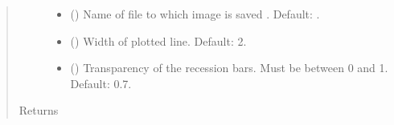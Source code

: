 \documentclass[letterpaper,10pt,openany,oneside,english]{sphinxmanual}
\begin{document}
\begin{fulllineitems}
\begin{quote}
\begin{description}
\begin{itemize}
\item {} 
 () \textendash{} Name of file to which image is saved . Default: .

\item {} 
 () \textendash{} Width of plotted line. Default: 2.

\item {} 
 () \textendash{} Transparency of the recession bars. Must be between 0 and 1. Default: 0.7.

\end{itemize}

\item[{Returns}] \leavevmode


\end{description}\end{quote}

\end{fulllineitems}

\end{document}
